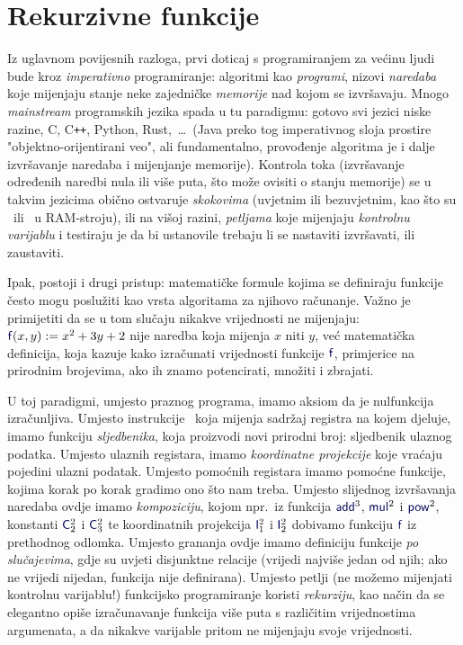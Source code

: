 \chapter{Rekurzivne funkcije}\label{ch:rek}

Iz uglavnom povijesnih razloga, prvi doticaj s programiranjem za većinu ljudi bude kroz \emph{imperativno} programiranje: algoritmi kao \emph{programi}, nizovi \emph{naredaba} koje mijenjaju stanje neke zajedničke \emph{memorije} nad kojom se izvršavaju. Mnogo \emph{mainstream} programskih jezika spada u tu paradigmu: gotovo svi jezici niske razine, C, C\texttt{++}, Python, Rust,~\ldots\ (Java preko tog imperativnog sloja prostire "objektno-orijentirani veo", ali fundamentalno, provođenje algoritma je i dalje izvršavanje naredaba i mijenjanje memorije). Kontrola toka (izvršavanje određenih naredbi nula ili više puta, što može ovisiti o stanju memorije) se u takvim jezicima obično ostvaruje \emph{skokovima} (uvjetnim ili bezuvjetnim, kao što su \dec\ ili \goto\ u RAM-stroju), ili na višoj razini, \emph{petljama} koje mijenjaju \emph{kontrolnu varijablu} i testiraju je da bi ustanovile trebaju li se nastaviti izvršavati, ili zaustaviti.

Ipak, postoji i drugi pristup: matematičke formule kojima se definiraju funkcije često mogu poslužiti kao vrsta algoritama za njihovo računanje. Važno je primijetiti da se u tom slučaju nikakve vrijednosti ne mijenjaju: $\f f(x,y):=x^2+3y+2$ nije naredba koja mijenja $x$ niti $y$, već matematička definicija, koja kazuje kako izračunati vrijednosti funkcije $\f f$, primjerice na prirodnim brojevima, ako ih znamo potencirati, množiti i zbrajati.

U toj paradigmi, umjesto praznog programa, imamo aksiom da je nulfunkcija izračunljiva. Umjesto instrukcije \inc\ koja mijenja sadržaj registra na kojem djeluje, imamo funkciju \emph{sljedbenika}, koja proizvodi novi prirodni broj: sljedbenik ulaznog podatka. Umjesto ulaznih registara, imamo \emph{koordinatne projekcije} koje vraćaju pojedini ulazni podatak. Umjesto pomoćnih registara imamo pomoćne funkcije, kojima korak po korak gradimo ono što nam treba. Umjesto slijednog izvršavanja naredaba ovdje imamo \emph{kompoziciju}, kojom npr.\ iz funkcija $\f{add}^3$, $\f{mul}^2$ i $\f{pow}^2$, konstanti $\f C_2^2$ i $\f C_3^2$ te koordinatnih projekcija $\f I_1^2$ i $\f I_2^2$ dobivamo funkciju $\f f$ iz prethodnog odlomka. Umjesto grananja ovdje imamo definiciju funkcije \emph{po slučajevima}, gdje su uvjeti disjunktne relacije (vrijedi najviše jedan od njih; ako ne vrijedi nijedan, funkcija nije definirana). Umjesto petlji (ne možemo mijenjati kontrolnu varijablu!) funkcijsko programiranje koristi \emph{rekurziju}, kao način da se elegantno opiše izračunavanje funkcija više puta s različitim vrijednostima argumenata, a da nikakve varijable pritom ne mijenjaju svoje vrijednosti. 

